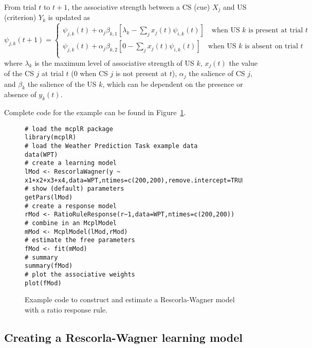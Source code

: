 \documentclass[doc]{apa}
\renewcommand{\vec}[1]{\text{\bf{#1}}}
\begin{document}
From trial $t$ to $t+1$, the associative strength between a CS (cue) $X_j$ and US (criterion) $Y_k$ is updated as
\begin{equation}
\psi_{j,k}(t+1) = \begin{cases} \psi_{j,k}(t) + \alpha_j \beta_{k,1} [\lambda_k - \sum_j x_j(t) \psi_{i,k}(t)] \quad \text{when US $k$ is present at trial $t$} \\
\psi_{j,k}(t) + \alpha_j \beta_{k,2} [0 - \sum_j x_j(t) \psi_{i,k}(t)] \quad \text{when US $k$ is absent on trial $t$} \\
\end{cases}
\end{equation}
where $\lambda_k$ is the maximum level of associative strength of US $k$, $x_j(t)$ the value of the CS $j$ at trial $t$ (0 when CS $j$ is not present at $t$), $\alpha_j$ the salience of CS $j$, and $\beta_k$ the salience of the US $k$, which can be dependent on the presence or absence of $y_k(t)$.


Complete code for the example can be found in Figure~\ref{fig:R-W}. 


\begin{figure}
\begin{verbatim}
# load the mcplR package
library(mcplR)
# load the Weather Prediction Task example data
data(WPT)
# create a learning model
lMod <- RescorlaWagner(y ~ x1+x2+x3+x4,data=WPT,ntimes=c(200,200),remove.intercept=TRUE)
# show (default) parameters
getPars(lMod)
# create a response model
rMod <- RatioRuleResponse(r~1,data=WPT,ntimes=c(200,200))
# combine in an McplModel
mMod <- McplModel(lMod,rMod)
# estimate the free parameters
fMod <- fit(mMod)
# summary
summary(fMod)
# plot the associative weights
plot(fMod)
\end{verbatim}
\caption{Example code to construct and estimate a Rescorla-Wagner model with a ratio response rule.}
\label{fig:R-W} 
\end{figure}

\subsection{Creating a Rescorla-Wagner learning model}
\end{document}
